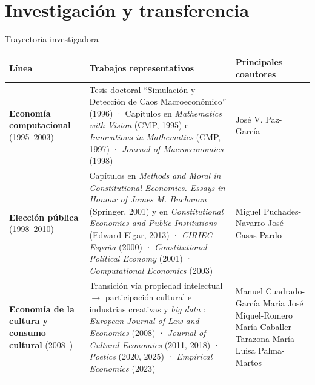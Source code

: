 \documentclass[
  8pt,
  ignorenonframetext,
  aspectratio=169,
  spanish,
]{beamer}
\newcommand{\lightrowrule}{\arrayrulecolor{black!25}\specialrule{0.4pt}{1pt}{1pt}\arrayrulecolor{black}}
\begin{document}
\section{Investigación y
transferencia}\label{investigaciuxf3n-y-transferencia}


\begin{frame}[shrink]{Trayectoria investigadora}
\label{trayectoria-investigadora}
~

\begin{longtable}[]{@{}
  >{\raggedright\arraybackslash}p{}
  >{\raggedright\arraybackslash}p{}
  >{\raggedright\arraybackslash}p{}@{}}
\toprule\noalign{}
\begin{minipage}[b]{\linewidth}\raggedright
Línea
\end{minipage} & \begin{minipage}[b]{\linewidth}\raggedright
Trabajos representativos
\end{minipage} & \begin{minipage}[b]{\linewidth}\raggedright
Principales coautores
\end{minipage} \\
\midrule\noalign{}
\endhead
\bottomrule\noalign{}
\endlastfoot
\textbf{Economía computacional} (1995--2003) & Tesis doctoral
``Simulación y Detección de Caos Macroeconómico'' (1996) · Capítulos en
\emph{Mathematics with Vision} (CMP, 1995) e \emph{Innovations in
Mathematics} (CMP, 1997) · \emph{Journal of Macroeconomics} (1998) &
José V. Paz-García \\ \lightrowrule
\textbf{Elección pública} (1998--2010) & Capítulos en \emph{Methods and
Moral in Constitutional Economics. Essays in Honour of James M.
Buchanan} (Springer, 2001) y en \emph{Constitutional Economics and
Public Institutions} (Edward Elgar, 2013) · \emph{CIRIEC-España} (2000)
· \emph{Constitutional Political Economy} (2001) · \emph{Computational
Economics} (2003) & Miguel Puchades-Navarro José Casas-Pardo \\ \lightrowrule
\textbf{Economía de la cultura y consumo cultural} (2008--) & Transición
vía propiedad intelectual \(\to\) participación cultural e industrias
creativas y \emph{big data} : \emph{European Journal of Law and
Economics} (2008) · \emph{Journal of Cultural Economics} (2011, 2018) ·
\emph{Poetics} (2020, 2025) · \emph{Empirical Economics} (2023) & Manuel
Cuadrado-García María José Miquel-Romero María Caballer-Tarazona María
Luisa Palma-Martos \\ \lightrowrule
\end{longtable}


\end{frame}
\end{document}
